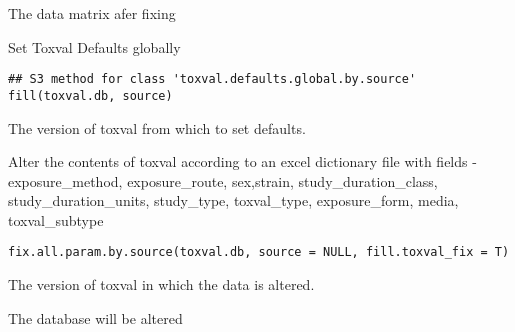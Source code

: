 \documentclass[letterpaper]{book}
\begin{document}
%
\begin{Value}
The data matrix afer fixing
\end{Value}
%
\begin{Description}\relax
Set Toxval Defaults globally
\end{Description}
%
\begin{Usage}
\begin{verbatim}
## S3 method for class 'toxval.defaults.global.by.source'
fill(toxval.db, source)
\end{verbatim}
\end{Usage}
%
\begin{Arguments}
\begin{ldescription}
\item[\code{toxval.db}] The version of toxval from which to set defaults.
\end{ldescription}
\end{Arguments}
%
\begin{Description}\relax
Alter the contents of toxval according to an excel dictionary file with fields -
exposure\_method, exposure\_route, sex,strain, study\_duration\_class, study\_duration\_units, study\_type,
toxval\_type, exposure\_form, media, toxval\_subtype
\end{Description}
%
\begin{Usage}
\begin{verbatim}
fix.all.param.by.source(toxval.db, source = NULL, fill.toxval_fix = T)
\end{verbatim}
\end{Usage}
%
\begin{Arguments}
\begin{ldescription}
\item[\code{toxval.db}] The version of toxval in which the data is altered.
\end{ldescription}
\end{Arguments}
%
\begin{Value}
The database will be altered
\end{Value}
\end{document}
